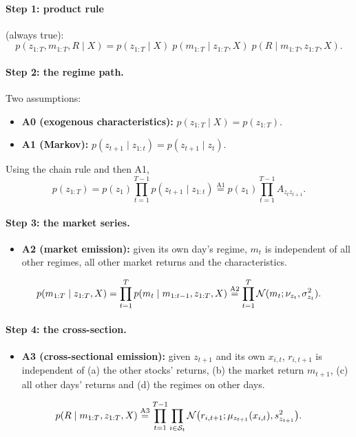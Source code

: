 \paragraph{Step 1: product rule} (always true):
\begin{equation}
p(z_{1:T},m_{1:T},R\mid X)=p(z_{1:T}\mid X)\;p(m_{1:T}\mid z_{1:T},X)\;p(R\mid m_{1:T},z_{1:T},X).
\end{equation}

\paragraph{Step 2: the regime path.} Two assumptions:
\begin{itemize}
  \item \textbf{A0 (exogenous characteristics):} $p(z_{1:T}\mid X)=p(z_{1:T})$.
  \item \textbf{A1 (Markov):} $p(z_{t+1}\mid z_{1:t})=p(z_{t+1}\mid z_t)$.
\end{itemize}
Using the chain rule and then A1,
\begin{equation}
p(z_{1:T})=p(z_1)\prod_{t=1}^{T-1}p(z_{t+1}\mid z_{1:t})\overset{\text{A1}}{=}p(z_1)\prod_{t=1}^{T-1}A_{z_tz_{t+1}}.
\end{equation}

\paragraph{Step 3: the market series.}
\begin{itemize}
  \item \textbf{A2 (market emission):} given its own day's regime, $m_t$ is independent of all other regimes, all other market returns and the characteristics.
\end{itemize}
\begin{equation}
p(m_{1:T}\mid z_{1:T},X)=\prod_{t=1}^Tp(m_t\mid m_{1:t-1},z_{1:T},X)\overset{\text{A2}}{=}\prod_{t=1}^T\mathcal{N}(m_t;\nu_{z_t},\sigma_{z_t}^2).
\end{equation}

\paragraph{Step 4: the cross-section.}
\begin{itemize}
  \item \textbf{A3 (cross-sectional emission):} given $z_{t+1}$ and its own $x_{i,t}$, $r_{i,t+1}$ is independent of (a) the other stocks' returns, (b) the market return $m_{t+1}$, (c) all other days' returns and (d) the regimes on other days.
\end{itemize}
\begin{equation}
p(R\mid m_{1:T},z_{1:T},X)\overset{\text{A3}}{=}\prod_{t=1}^{T-1}\prod_{i\in\mathcal S_t}\mathcal{N}\big(r_{i,t+1};\mu_{z_{t+1}}(x_{i,t}),s_{z_{t+1}}^2\big).
\end{equation}

